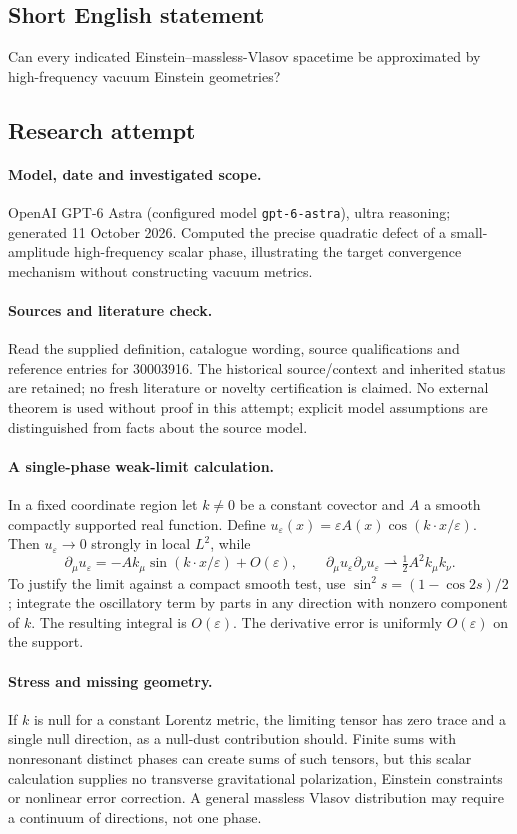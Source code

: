 \documentclass[11pt]{article}
\begin{document}
\subsection{Short English statement}
Can every indicated Einstein--massless-Vlasov spacetime be approximated by high-frequency vacuum Einstein geometries?
\subsection{Research attempt}
\paragraph{Model, date and investigated scope.}
OpenAI GPT-6 Astra (configured model \texttt{gpt-6-astra}), ultra reasoning; generated 11 October 2026. Computed the precise quadratic defect of a small-amplitude high-frequency scalar phase, illustrating the target convergence mechanism without constructing vacuum metrics.

\paragraph{Sources and literature check.}
Read the supplied definition, catalogue wording, source qualifications and reference entries for 30003916. The historical source/context and inherited status are retained; no fresh literature or novelty certification is claimed. No external theorem is used without proof in this attempt; explicit model assumptions are distinguished from facts about the source model.

\paragraph{A single-phase weak-limit calculation.} In a fixed coordinate region let \(k\ne0\) be a constant covector and \(A\) a smooth compactly supported real function. Define \(u_\varepsilon(x)=\varepsilon A(x)\cos(k\cdot x/\varepsilon)\). Then \(u_\varepsilon\to0\) strongly in local \(L^2\), while
\[
 \partial_\mu u_\varepsilon=-A k_\mu\sin(k\cdot x/\varepsilon)+O(\varepsilon),\qquad
 \partial_\mu u_\varepsilon\partial_\nu u_\varepsilon\rightharpoonup\tfrac12 A^2k_\mu k_\nu.
\]
To justify the limit against a compact smooth test, use \(\sin^2s=(1-\cos2s)/2\); integrate the oscillatory term by parts in any direction with nonzero component of \(k\). The resulting integral is \(O(\varepsilon)\). The derivative error is uniformly \(O(\varepsilon)\) on the support.
\paragraph{Stress and missing geometry.} If \(k\) is null for a constant Lorentz metric, the limiting tensor has zero trace and a single null direction, as a null-dust contribution should. Finite sums with nonresonant distinct phases can create sums of such tensors, but this scalar calculation supplies no transverse gravitational polarization, Einstein constraints or nonlinear error correction. A general massless Vlasov distribution may require a continuum of directions, not one phase.
\end{document}
